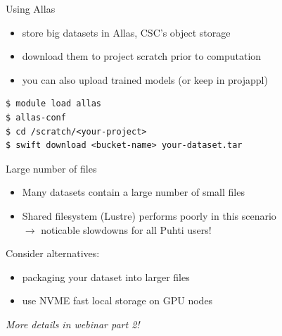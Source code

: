 \documentclass[aspectratio=1610,14pt]{beamer}
\newcommand{\vitem}{\vfill\item}
\begin{document}
\begin{frame}[fragile]{Using Allas}
  \begin{itemize}
  \item store big datasets in Allas, CSC's object storage
  \item download them to project scratch prior to computation
  \item you can also upload trained models (or keep in projappl)
  \end{itemize}

  \vfill
  
\begin{verbatim}
$ module load allas
$ allas-conf
$ cd /scratch/<your-project>
$ swift download <bucket-name> your-dataset.tar  
\end{verbatim}
\end{frame}

\begin{frame}{Large number of files}
  \begin{itemize}
  \vitem Many datasets contain a large number of small files
  \vitem Shared filesystem (Lustre) performs poorly in this scenario \\
    $\rightarrow$ noticable slowdowns for all Puhti users!
  \end{itemize}

  \vfill
  Consider alternatives:

  \begin{itemize}
    \vitem packaging your dataset into larger files                     
    \vitem use NVME fast local storage on GPU nodes
  \end{itemize}

  \vfill
  \emph{More details in webinar part 2!}

\end{frame}



  

\end{document}
